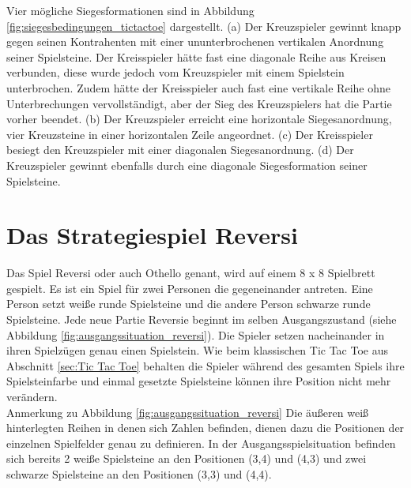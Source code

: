 Vier mögliche Siegesformationen sind in Abbildung \ref{fig:siegesbedingungen_tictactoe} dargestellt. (a) Der Kreuzspieler gewinnt knapp gegen seinen Kontrahenten mit einer ununterbrochenen vertikalen Anordnung seiner Spielsteine. Der Kreisspieler hätte fast eine diagonale Reihe aus Kreisen verbunden, diese wurde jedoch vom Kreuzspieler mit einem Spielstein unterbrochen. Zudem hätte der Kreisspieler auch fast eine vertikale Reihe ohne Unterbrechungen vervollständigt, aber der Sieg des Kreuzspielers hat die Partie vorher beendet. (b) Der Kreuzspieler erreicht eine horizontale Siegesanordnung, vier Kreuzsteine in einer horizontalen Zeile angeordnet. (c) Der Kreisspieler besiegt den Kreuzspieler mit einer diagonalen Siegesanordnung. (d) Der Kreuzspieler gewinnt ebenfalls durch eine diagonale Siegesformation seiner Spielsteine. 


\section{Das Strategiespiel Reversi}
\label{sec:Das Strategiespiel Reversi}
Das Spiel Reversi oder auch Othello genant, wird auf einem 8 x 8 Spielbrett gespielt. Es ist ein Spiel für zwei Personen die gegeneinander antreten. Eine Person setzt weiße runde Spielsteine und die andere Person schwarze runde Spielsteine. Jede neue Partie Reversie beginnt im selben Ausgangszustand (siehe Abbildung \ref{fig:ausgangssituation_reversi}). Die Spieler setzen nacheinander in ihren Spielzügen genau einen Spielstein. Wie beim klassischen Tic Tac Toe aus Abschnitt \ref{sec:Tic Tac Toe} behalten die Spieler während des gesamten Spiels ihre Spielsteinfarbe und einmal gesetzte Spielsteine können ihre Position nicht mehr verändern. \\

Anmerkung zu Abbildung \ref{fig:ausgangssituation_reversi}  Die äußeren weiß hinterlegten Reihen in denen sich Zahlen befinden, dienen dazu die Positionen der einzelnen Spielfelder genau zu definieren. In der Ausgangsspielsituation befinden sich bereits 2 weiße Spielsteine an den Positionen (3,4) und (4,3) und zwei schwarze Spielsteine an den Positionen (3,3) und (4,4). \\

